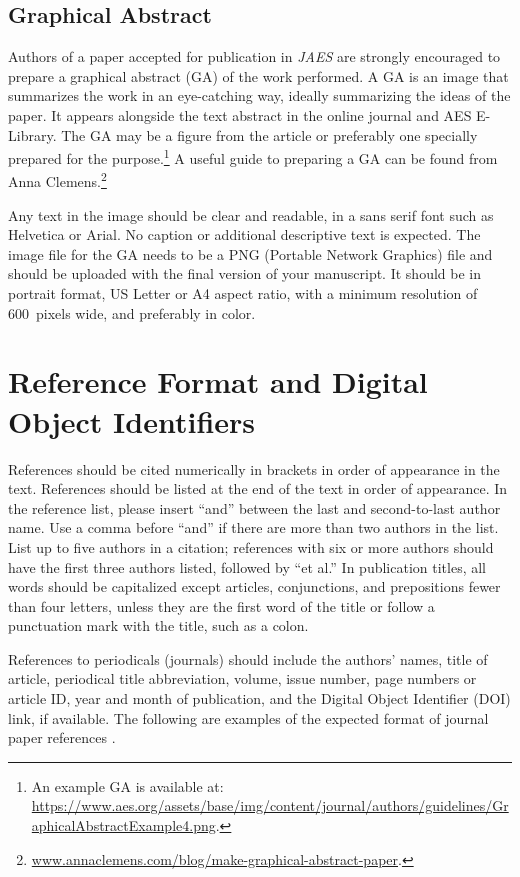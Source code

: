 \documentclass[fleqn,draft]{jaes}
\begin{document}
\subsection{Graphical Abstract}
Authors of a paper accepted for publication in \emph{JAES} are strongly encouraged to prepare a graphical abstract (GA) of the work performed. A GA is an image that summarizes the work in an eye-catching way, ideally summarizing the ideas of the paper. It appears alongside the text abstract in the online journal and AES E-Library. The GA may be a figure from the article or preferably one specially prepared for the purpose.\footnote{An example GA is available at: \url{https://www.aes.org/assets/base/img/content/journal/authors/guidelines/GraphicalAbstractExample4.png}.} A useful guide to preparing a GA can be found from Anna Clemens.\footnote{\url{www.annaclemens.com/blog/make-graphical-abstract-paper}.}

Any text in the image should be clear and readable, in a sans serif font such as Helvetica or Arial. No caption or additional descriptive text is expected. The image file for the GA needs to be a PNG (Portable Network Graphics) file and should be uploaded with the final version of your manuscript. It should be in portrait format, US Letter or A4 aspect ratio, with a minimum resolution of 600~pixels wide, and preferably in color.

\section{Reference Format and Digital Object Identifiers}\label{sec:refs}
References should be cited numerically in brackets in order of appearance in the text. References should be listed at the end of the text in order of appearance. In the reference list, please insert “and” between the last and second-to-last author name. Use a comma before “and” if there are more than two authors in the list. List up to five authors in a citation; references with six or more authors should have the first three authors listed, followed by ``et al.''  
In publication titles, all words should be capitalized except articles, conjunctions, and prepositions fewer than four letters, unless they are the first word of the title or follow a punctuation mark with the title, such as a colon. %

References to periodicals (journals) should include the authors’ names, title of article, periodical title abbreviation, volume, issue number, page numbers or article ID, year and month of publication, and the Digital Object Identifier (DOI) link, if available. The following are examples of the expected format of journal paper references \cite{a_journal_paper, a_journal_paper_with_many_authors, a_journal_paper_with_article_ID}.
\end{document}
